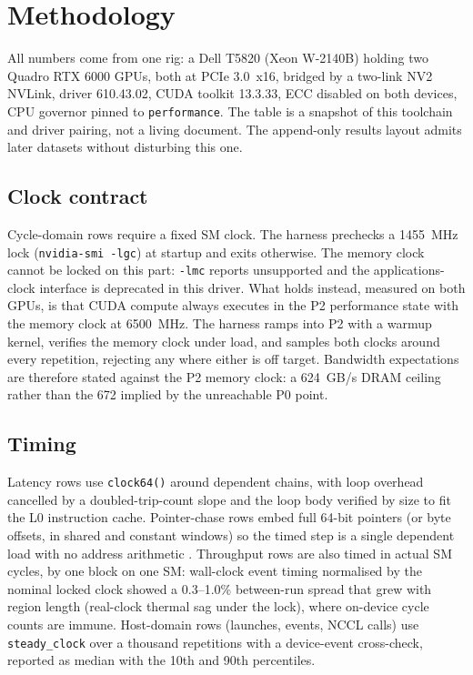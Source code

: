 \section{Methodology}
\label{sec:methodology}

All numbers come from one rig: a Dell T5820 (Xeon W-2140B) holding two
Quadro RTX 6000 GPUs, both at PCIe 3.0~x16, bridged by a two-link NV2
NVLink, driver 610.43.02, CUDA toolkit 13.3.33, ECC disabled on both
devices, CPU governor pinned to \texttt{performance}. The table is a
snapshot of this toolchain and driver pairing, not a living document. The
append-only results layout admits later datasets without disturbing this
one.

\subsection{Clock contract}
\label{sec:clocks}

Cycle-domain rows require a fixed SM clock. The harness prechecks a
1455~MHz lock (\texttt{nvidia-smi -lgc}) at startup and exits otherwise.
The memory clock cannot be locked on this part: \texttt{-lmc} reports
unsupported and the applications-clock interface is deprecated in this
driver. What holds instead, measured on both GPUs, is that CUDA compute
always executes in the P2 performance state with the memory clock at
6500~MHz. The harness ramps into P2 with a warmup kernel, verifies the
memory clock under load, and samples both clocks around every repetition,
rejecting any where either is off target. Bandwidth expectations are
therefore stated against the P2 memory clock: a 624~GB/s DRAM ceiling
rather than the 672 implied by the unreachable P0 point.

\subsection{Timing}

Latency rows use \texttt{clock64()} around dependent chains, with loop
overhead cancelled by a doubled-trip-count slope and the loop body
verified by size to fit the L0 instruction cache. Pointer-chase rows
embed full 64-bit pointers (or byte offsets, in shared and constant
windows) so the timed step is a single dependent load with no address
arithmetic \citep{wong2010demystifying,mei2017dissecting}. Throughput
rows are also timed in actual SM cycles, by one block on one SM:
wall-clock event timing normalised by the nominal locked clock showed a
0.3--1.0\% between-run spread that grew with region length (real-clock
thermal sag under the lock), where on-device cycle counts are immune.
Host-domain rows (launches, events, NCCL calls) use
\texttt{steady\_clock} over a thousand repetitions with a device-event
cross-check, reported as median with the 10th and 90th percentiles.

